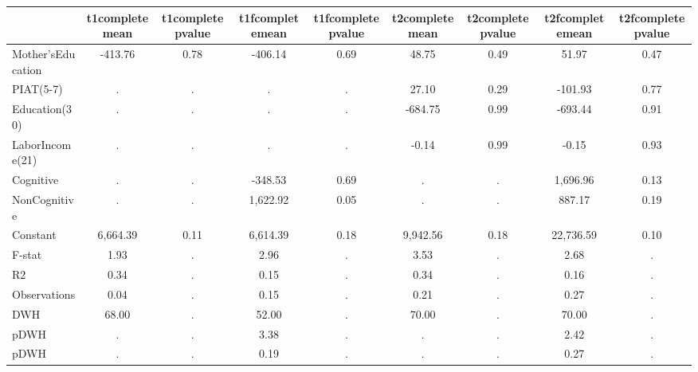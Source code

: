 \begin{table}[htbp]
\begin{tabular}{lcccccccc} \hline \hline
 & t1completemean  & t1completepvalue  & t1fcompletemean  & t1fcompletepvalue  & t2completemean  & t2completepvalue  & t2fcompletemean  & t2fcompletepvalue  \\  \hline 
Mother'sEducation &      -413.76 &         0.78 &      -406.14 &         0.69 &        48.75 &         0.49 &        51.97 &         0.47 \\  
PIAT(5-7) &            . &            . &            . &            . &        27.10 &         0.29 &      -101.93 &         0.77 \\  
Education(30) &            . &            . &            . &            . &      -684.75 &         0.99 &      -693.44 &         0.91 \\  
LaborIncome(21) &            . &            . &            . &            . &        -0.14 &         0.99 &        -0.15 &         0.93 \\  
Cognitive &            . &            . &      -348.53 &         0.69 &            . &            . &     1,696.96 &         0.13 \\  
NonCognitive &            . &            . &     1,622.92 &         0.05 &            . &            . &       887.17 &         0.19 \\  
Constant &     6,664.39 &         0.11 &     6,614.39 &         0.18 &     9,942.56 &         0.18 &    22,736.59 &         0.10 \\  
F-stat &         1.93 &            . &         2.96 &            . &         3.53 &            . &         2.68 &            . \\  
R2 &         0.34 &            . &         0.15 &            . &         0.34 &            . &         0.16 &            . \\  
Observations &         0.04 &            . &         0.15 &            . &         0.21 &            . &         0.27 &            . \\  
DWH &        68.00 &            . &        52.00 &            . &        70.00 &            . &        70.00 &            . \\  
pDWH &            . &            . &         3.38 &            . &            . &            . &         2.42 &            . \\  
pDWH &            . &            . &         0.19 &            . &            . &            . &         0.27 &            . \\  
\hline \hline \end{tabular}
\end{table}
